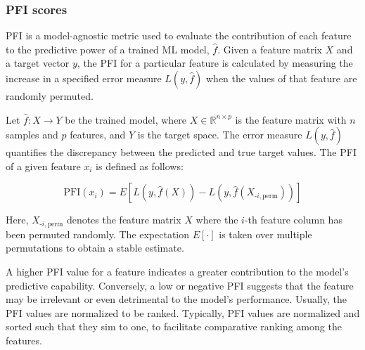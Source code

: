 \subsubsection{PFI scores}

PFI is a model-agnostic metric used to evaluate the contribution of each feature to the predictive power of a trained ML model, \(\hat{f}\). Given a feature matrix \(X\) and a target vector \(y\), the PFI for a particular feature is calculated by measuring the increase in a specified error measure \(L(y, \hat{f})\) when the values of that feature are randomly permuted.

Let \(\hat{f}: X \rightarrow Y\) be the trained model, where \(X \in \mathbb{R}^{n \times p}\) is the feature matrix with \(n\) samples and \(p\) features, and \(Y\) is the target space. The error measure \(L(y, \hat{f})\) quantifies the discrepancy between the predicted and true target values. The PFI of a given feature \(x_i\) is defined as follows:

\begin{equation}
\text{PFI}(x_i) = E\left[ L(y, \hat{f}(X)) - L\left(y, \hat{f}(X_{\text{-}i, \text{perm}})\right) \right]
\end{equation}

Here, \(X_{\text{-}i, \text{perm}}\) denotes the feature matrix \(X\) where the \(i\)-th feature column has been permuted randomly. The expectation \(E[\cdot]\) is taken over multiple permutations to obtain a stable estimate.

A higher PFI value for a feature indicates a greater contribution to the model's predictive capability. Conversely, a low or negative PFI suggests that the feature may be irrelevant or even detrimental to the model's performance. Usually, the PFI values are normalized to be ranked. Typically, PFI values are normalized and sorted such that they sim to one, to facilitate comparative ranking among the features. 

